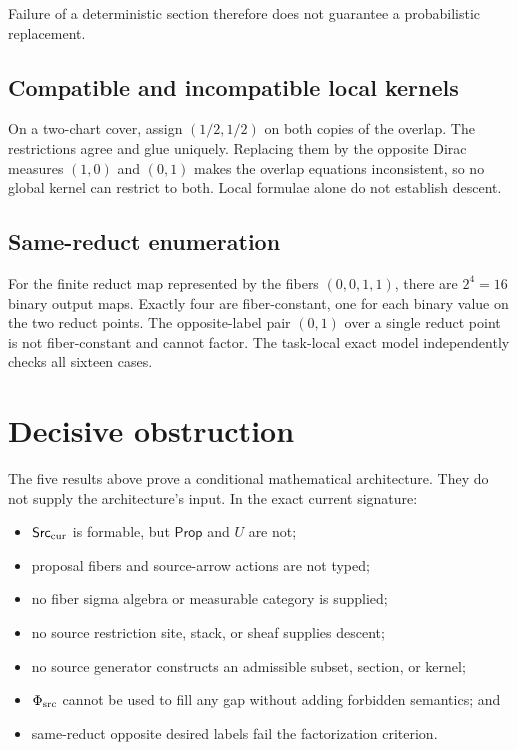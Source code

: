 \documentclass[11pt]{article}
\newcommand{\Src}{\mathsf{Src}}
\newcommand{\Prop}{\mathsf{Prop}}
\begin{document}
Failure of a deterministic section therefore does not guarantee a
probabilistic replacement.

\subsection{Compatible and incompatible local kernels}

On a two-chart cover, assign $(1/2,1/2)$ on both copies of the overlap.  The
restrictions agree and glue uniquely.  Replacing them by the opposite Dirac
measures $(1,0)$ and $(0,1)$ makes the overlap equations inconsistent, so no
global kernel can restrict to both.  Local formulae alone do not establish
descent.

\subsection{Same-reduct enumeration}

For the finite reduct map represented by the fibers
$(0,0,1,1)$, there are $2^4=16$ binary output maps.  Exactly four are
fiber-constant, one for each binary value on the two reduct points.  The
opposite-label pair $(0,1)$ over a single reduct point is not fiber-constant
and cannot factor.  The task-local exact model independently checks all
sixteen cases.

\section{Decisive obstruction}

The five results above prove a conditional mathematical architecture.  They
do not supply the architecture's input.  In the exact current signature:

\begin{itemize}
\item $\Src_{\rm cur}$ is formable, but $\Prop$ and $U$ are not;
\item proposal fibers and source-arrow actions are not typed;
\item no fiber sigma algebra or measurable category is supplied;
\item no source restriction site, stack, or sheaf supplies descent;
\item no source generator constructs an admissible subset, section, or kernel;
\item $\Phi_{\rm src}$ cannot be used to fill any gap without adding forbidden
      semantics; and
\item same-reduct opposite desired labels fail the factorization criterion.
\end{itemize}
\end{document}
